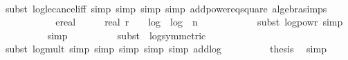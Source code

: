 \begin{isabellebody}
\ \ \ \ \ \ \ \ \isamarkupfalse%
\ {\isacharparenleft}{\kern0pt}subst\ log{\isacharunderscore}{\kern0pt}le{\isacharunderscore}{\kern0pt}cancel{\isacharunderscore}{\kern0pt}iff{\isacharcomma}{\kern0pt}\ simp{\isacharcomma}{\kern0pt}\ simp{\isacharcomma}{\kern0pt}\ simp{\isacharcomma}{\kern0pt}\ simp\ add{\isacharcolon}{\kern0pt}power{}{\isacharunderscore}{\kern0pt}eq{\isacharunderscore}{\kern0pt}square\ algebra{\isacharunderscore}{\kern0pt}simps{\isacharparenright}{\kern0pt}\isanewline
\ \ \ \ \ \ \isamarkupfalse%
\ \isamarkupfalse%
\ {\isachardoublequoteopen}{\isachardot}{\kern0pt}{\isachardot}{\kern0pt}{\isachardot}{\kern0pt}\ {\isacharequal}{\kern0pt}\ ereal\ {\isacharparenleft}{\kern0pt}{}{}\ {\isacharplus}{\kern0pt}\ \ {}\ {\isacharasterisk}{\kern0pt}\ real\ r\ {\isacharplus}{\kern0pt}\ {}\ {\isacharasterisk}{\kern0pt}\ log\ {}\ {\isacharparenleft}{\kern0pt}log\ {}\ {\isacharparenleft}{\kern0pt}n\ {\isacharplus}{\kern0pt}\ {}{\isacharparenright}{\kern0pt}{\isacharparenright}{\kern0pt}{\isacharparenright}{\kern0pt}{\isachardoublequoteclose}\isanewline
\ \ \ \ \ \ \ \ \isamarkupfalse%
\ {\isacharparenleft}{\kern0pt}subst\ log{\isacharunderscore}{\kern0pt}powr{\isacharcomma}{\kern0pt}\ simp{\isacharparenright}{\kern0pt}\isanewline
\ \ \ \ \ \ \ \ \isamarkupfalse%
\ {\isacharparenleft}{\kern0pt}simp{\isacharparenright}{\kern0pt}\isanewline
\ \ \ \ \ \ \ \ \isamarkupfalse%
\ {\isacharparenleft}{\kern0pt}subst\ {\isacharparenleft}{\kern0pt}{}{\isacharparenright}{\kern0pt}\ log{\isacharunderscore}{\kern0pt}{}{\isacharunderscore}{\kern0pt}{}{\isacharbrackleft}{\kern0pt}symmetric{\isacharbrackright}{\kern0pt}{\isacharparenright}{\kern0pt}\ \isanewline
\ \ \ \ \ \ \ \ \isamarkupfalse%
\ {\isacharparenleft}{\kern0pt}subst\ log{\isacharunderscore}{\kern0pt}mult{\isacharcomma}{\kern0pt}\ simp{\isacharcomma}{\kern0pt}\ simp{\isacharcomma}{\kern0pt}\ simp{\isacharcomma}{\kern0pt}\ simp{\isacharcomma}{\kern0pt}\ simp\ add{\isacharcolon}{\kern0pt}log{\isacharunderscore}{\kern0pt}{}{\isacharunderscore}{\kern0pt}{}{\isacharparenright}{\kern0pt}\isanewline
\ \ \ \ \ \ \isamarkupfalse%
\ \isamarkupfalse%
\ {\isacharquery}{\kern0pt}thesis\ \isamarkupfalse%
\ simp\isanewline
\ \ \ \ \isamarkupfalse%
\isanewline
\ \ \ \ \ \ \isamarkupfalse%

\end{isabellebody}
